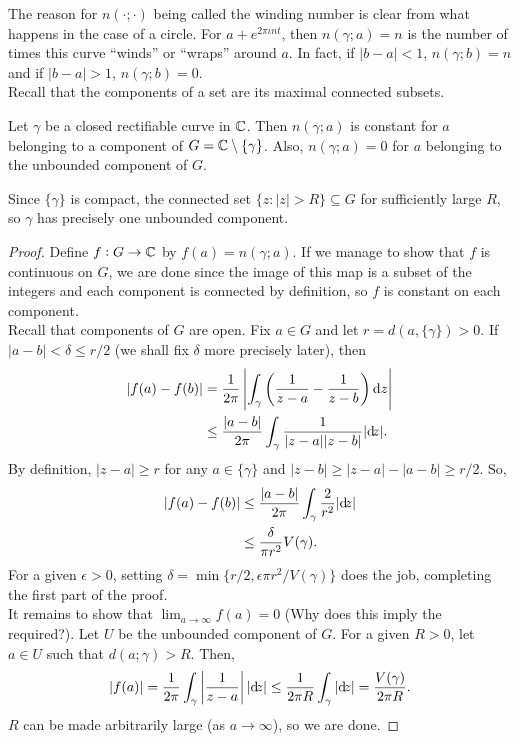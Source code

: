 	The reason for $n(\cdot;\cdot)$ being called the winding number is clear from what happens in the case of a circle. For $a + e^{2\pi\iota n t}$, then $n(\gamma;a) = n$ is the number of times this curve ``winds'' or ``wraps'' around $a$. In fact, if $|b-a| < 1$, $n(\gamma;b) = n$ and if $|b-a| > 1$, $n(\gamma;b) = 0$.\\

	Recall that the components of a set are its maximal connected subsets.

	\begin{ftheo}
		\label{theo: winding number constant on components}
		Let $\gamma$ be a closed rectifiable curve in $\mathbb{C}$. Then $n(\gamma;a)$ is constant for $a$ belonging to a component of $G = \mathbb{C} \setminus \{\gamma\}$. Also, $n(\gamma;a) = 0$ for $a$ belonging to the unbounded component of $G$.
	\end{ftheo}
	\begin{remark}
		Since $\{\gamma\}$ is compact, the connected set $\{ z : |z| > R \} \subseteq G$ for sufficiently large $R$, so $\gamma$ has precisely one unbounded component.
	\end{remark}
	\begin{proof}
		Define $f : G \to \mathbb{C}$ by $f(a) = n(\gamma;a)$.
		If we manage to show that $f$ is continuous on $G$, we are done since the image of this map is a subset of the integers and each component is connected by definition, so $f$ is constant on each component.\\
		Recall that components of $G$ are open. Fix $a \in G$ and let $r = d(a , \{\gamma\}) > 0$. If $|a-b| < \delta \le r/2$ (we shall fix $\delta$ more precisely later), then
		\begin{align*}
			|f(a) - f(b)| &= \frac{1}{2\pi} \left| \int_\gamma \left( \frac{1}{z-a} - \frac{1}{z-b} \right) \dif z \right| \\
				&\le \frac{|a-b|}{2\pi} \int_\gamma \frac{1}{|z-a||z-b|} |{\dif} {z}|.
		\end{align*}
		By definition, $|z-a| \ge r$ for any $a \in \{\gamma\}$ and $|z-b| \ge |z-a| - |a-b| \ge r/2$. So,
		\begin{align*}
			|f(a) - f(b)| &\le \frac{|a-b|}{2\pi} \int_\gamma \frac{2}{r^2} |{\dif} {z}| \\
				&\le \frac{\delta}{\pi r^2} V(\gamma).
		\end{align*}
		For a given $\epsilon > 0$, setting $\delta = \min\{r/2, \epsilon\pi r^2 / V(\gamma)\}$ does the job, completing the first part of the proof.\\

		It remains to show that $\lim_{a\to\infty}f(a) = 0$ (Why does this imply the required?). Let $U$ be the unbounded component of $G$. For a given $R > 0$, let $a \in U$ such that $d(a;\gamma) > R$. Then,
		\[ |f(a)| = \frac{1}{2\pi} \int_\gamma \left|\frac{1}{z-a}\right| |{\dif} {z}| \le \frac{1}{2\pi R} \int_\gamma |{\dif} {z}| = \frac{V(\gamma)}{2\pi R}. \]
		$R$ can be made arbitrarily large (as $a\to\infty$), so we are done.
	\end{proof}


